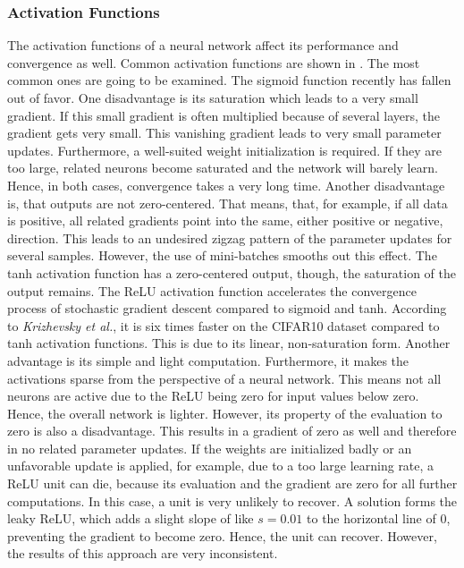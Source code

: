 \subsubsection{Activation Functions}
\label{sec:improving-performance-activation-functions}
The activation functions of a neural network affect its performance and convergence as well.
Common activation functions are shown in .
The most common ones are going to be examined.
The sigmoid function recently has fallen out of favor.
One disadvantage is its saturation which leads to a very small gradient.
If this small gradient is often multiplied because of several layers, the gradient gets very small.
This vanishing gradient leads to very small parameter updates.
Furthermore, a well-suited weight initialization is required.
If they are too large, related neurons become saturated and the network will barely learn.
Hence, in both cases, convergence takes a very long time.
Another disadvantage is, that outputs are not zero-centered.
That means, that, for example, if all data is positive, all related gradients point into the same, either positive or negative, direction.
This leads to an undesired zigzag pattern of the parameter updates for several samples.
However, the use of mini-batches smooths out this effect.
The tanh activation function has a zero-centered output, though, the saturation of the output remains.
The ReLU activation function accelerates the convergence process of stochastic gradient descent compared to sigmoid and tanh.
According to \textit{Krizhevsky et al.}, it is six times faster on the CIFAR10 dataset compared to tanh activation functions\cite{Krizhevsky:2012:ICD:2999134.2999257}.
This is due to its linear, non-saturation form.
Another advantage is its simple and light computation.
Furthermore, it makes the activations sparse from the perspective of a neural network.
This means not all neurons are active due to the ReLU being zero for input values below zero.
Hence, the overall network is lighter.
However, its property of the evaluation to zero is also a disadvantage.
This results in a gradient of zero as well and therefore in no related parameter updates.
If the weights are initialized badly or an unfavorable update is applied, for example, due to a too large learning rate, a ReLU unit can die, because its evaluation and the gradient are zero for all further computations.
In this case, a unit is very unlikely to recover.
A solution forms the leaky ReLU, which adds a slight slope of like $s = 0.01$ to the horizontal line of 0, preventing the gradient to become zero.
Hence, the unit can recover.
However, the results of this approach are very inconsistent.

